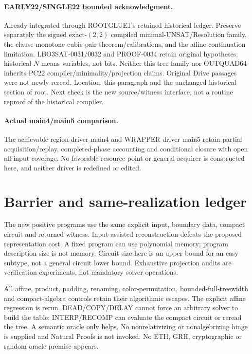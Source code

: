 \documentclass[11pt]{article}
\begin{document}
\paragraph{EARLY22/SINGLE22 bounded acknowledgment.}
Already integrated through ROOTGLUE1's retained historical ledger. Preserve
separately the signed exact-$(2,2)$ compiled minimal-UNSAT/Resolution family,
the clause-monotone cubic-pair theorem/calibrations, and the affine-continuation
limitation. LBO3SAT-0031/0032 and PROOF-0034 retain original hypotheses;
historical $N$ means variables, not bits. Neither this tree family nor
OUTQUAD64 inherits PC22 compiler/minimality/projection claims. Original Drive
passages were not newly reread. Location: this paragraph and the unchanged
historical section of root. Next check is the new source/witness interface,
not a routine reproof of the historical compiler.

\paragraph{Actual main4/main5 comparison.}
The achievable-region driver main4 and WRAPPER driver main5 retain partial
acquisition/replay, completed-phase accounting and conditional closure with
open all-input coverage. No favorable resource point or general acquirer is
constructed here, and neither driver is redefined or edited.

\section{Barrier and same-realization ledger}
The new positive programs use the same explicit input, boundary data, compact
circuit and returned witness. Input-assisted reconstruction defeats the
proposed representation cost. A fixed program can use polynomial memory;
program description size is not memory. Circuit size here is an upper bound
for an easy subtype, not a general circuit lower bound. Exhaustive projection
audits are verification experiments, not mandatory solver operations.

All affine, product, padding, renaming, color-permutation, bounded-full-treewidth
and compact-algebra controls retain their algorithmic escapes. The explicit
affine regression is rerun. DEAD/COPY/DELAY cannot force an arbitrary solver
to build the table; INTERP/RECOMP can evaluate the compact circuit or reread
the tree. A semantic oracle only helps. No nonrelativizing or nonalgebrizing
hinge is supplied and Natural Proofs is not invoked. No ETH, GRH, cryptographic
or random-oracle premise appears.
\end{document}
